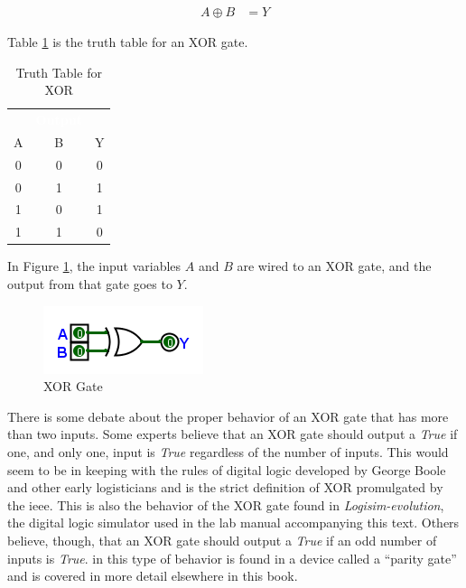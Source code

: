 \begin{align}
  \label{BF:eq:xor_symbol}
  A \oplus B &= Y
\end{align}

Table \ref{BF:tab:truth_table_for_xor} is the truth table for an \textsf{XOR}  gate.

\begin{table}[H]
  \sffamily
  \newcommand{\head}[1]{\textcolor{white}{\textbf{#1}}}    
  \begin{center}
    \begin{tabular}{ccc} 
      \rowcolor{black!75}
      \multicolumn{2}{c}{\head{Inputs}} & \head{Output} \\
      A & B & Y \\
      \hline
      0 & 0 & 0 \\
      0 & 1 & 1 \\
      1 & 0 & 1 \\
      1 & 1 & 0 
    \end{tabular}
  \end{center}
  \caption{Truth Table for XOR}
  \label{BF:tab:truth_table_for_xor}
\end{table}

In Figure \ref{fig:04_07}, the input variables $ A $ and $ B $ are wired to an \textsf{XOR}  gate, and the output from that gate goes to $ Y $. 

\begin{figure}[H]
	\centering
	\includegraphics[width=\maxwidth{.95\linewidth}]{gfx/04_07}
	\caption{XOR Gate}
	\label{fig:04_07}
\end{figure}


There is some debate about the proper behavior of an \textsf{XOR}  gate that has more than two inputs. Some experts believe that an \textsf{XOR} gate should output a \emph{True} if one, and only one, input is \emph{True} regardless of the number of inputs. This would seem to be in keeping with the rules of digital logic developed by George Boole and other early logisticians and is the strict definition of \textsf{XOR} promulgated by the \gls{ieee}. This is also the behavior of the \textsf{XOR} gate found in \textit{Logisim-evolution}, the digital logic simulator used in the lab manual accompanying this text. Others believe, though, that an \textsf{XOR} gate should output a \emph{True} if an odd number of inputs is \emph{True}. in \Le this type of behavior is found in a device called a ``parity gate'' and is covered in more detail elsewhere in this book.

